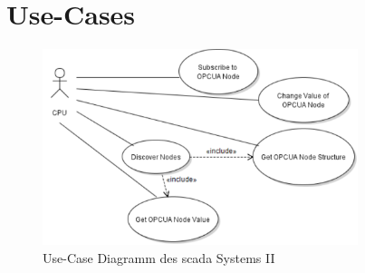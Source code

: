 \section{Use-Cases}
\begin{figure}[ht]
  \centering
  \includegraphics[width=0.82\textwidth]{content/hauptteil/systemEntwurf/res/useCase/II.pdf}
  \caption[Use-Case Diagramm des \acs{scada} Systems II]{Use-Case Diagramm des \acs{scada} Systems II}
  \label{fig:UCII}
\end{figure}

